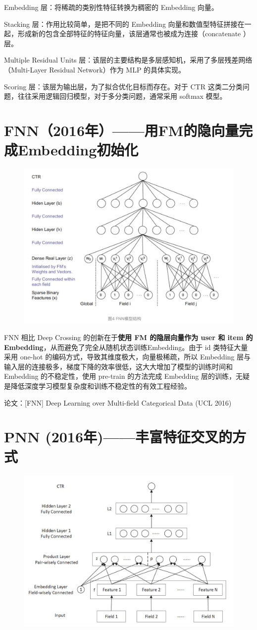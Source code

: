 \documentclass[12pt]{article}
\begin{document}
Embedding 层：将稀疏的类别性特征转换为稠密的 Embedding 向量。

Stacking 层：作用比较简单，是把不同的 Embedding 向量和数值型特征拼接在一起，形成新的包含全部特征的特征向量，该层通常也被成为连接（concatenate ）层。

Multiple Residual Units 层：该层的主要结构是多层感知机，采用了多层残差网络（Multi-Layer Residual Network）作为 MLP 的具体实现。

Scoring 层：该层为输出层，为了拟合优化目标而存在。对于 CTR 这类二分类问题，往往采用逻辑回归模型，对于多分类问题，通常采用 softmax 模型。

\section{FNN（2016年）——用FM的隐向量完成Embedding初始化}
\begin{figure}[H]
    \centering
    \includegraphics[width=.6\textwidth]{fig/FNN_Structure.png}
\end{figure}

FNN 相比 Deep Crossing 的创新在于\textbf{使用 FM 的隐层向量作为 user 和 item 的 Embedding}，从而避免了完全从随机状态训练Embedding。由于 id 类特征大量采用 one-hot 的编码方式，导致其维度极大，向量极稀疏，所以 Embedding 层与输入层的连接极多，梯度下降的效率很低，这大大增加了模型的训练时间和 Embedding 的不稳定性，使用 pre-train 的方法完成 Embedding 层的训练，无疑是降低深度学习模型复杂度和训练不稳定性的有效工程经验。

论文：[FNN] Deep Learning over Multi-field Categorical Data (UCL 2016)

\section{PNN (2016年)——丰富特征交叉的方式}
\begin{figure}[H]
    \centering
    \includegraphics[width=.6\textwidth]{fig/PNN_Structure.jpg}
\end{figure}
\end{document}
